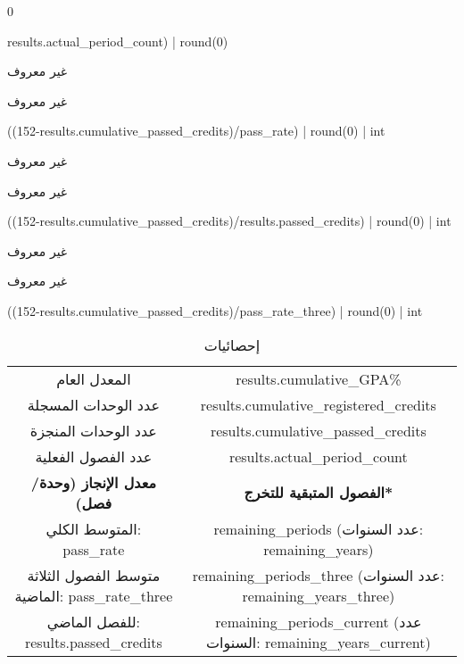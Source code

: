 \documentclass[fontsize=14,headinclude=true, headsepline=true,
footsepline=true]{scrartcl}
\begin{document}
{%
{%
  0
{%
{%
{%
 results.actual_period_count) | round(0) %
{%

{%
{%
غير معروف
{%
{%
غير معروف
{%
{%
{%
 ((152-results.cumulative_passed_credits)/pass_rate) | round(0) | int %
{%
{%


{%
{%
غير معروف
{%
{%
غير معروف
{%
{%
{%
 ((152-results.cumulative_passed_credits)/results.passed_credits) | round(0) | int %
{%
{%

{%
{%
غير معروف
{%
{%
غير معروف
{%
{%
{%
 ((152-results.cumulative_passed_credits)/pass_rate_three) | round(0) | int %
{%
{%


 \begin{table}[!ht]
    \renewcommand*{\arraystretch}{0.8}
   \centering
\small
\caption{إحصائيات}
\begin{tabular}{cccc}
\toprule
\multicolumn{2}{c}{المعدل العام} &  \multicolumn{2}{c}{ {{results.cumulative_GPA}}\% } \\
\multicolumn{2}{c}{عدد الوحدات المسجلة} & \multicolumn{2}{c}{ {{results.cumulative_registered_credits}} }\\
\multicolumn{2}{c}{ عدد الوحدات المنجزة} & \multicolumn{2}{c}{ {{results.cumulative_passed_credits}} }\\
\multicolumn{2}{c}{ عدد الفصول الفعلية} & \multicolumn{2}{c}{ {{results.actual_period_count}} }\\
\midrule
\multicolumn{2}{c}{\textbf{معدل الإنجاز (وحدة/فصل)}} & \multicolumn{2}{c}{\textbf{الفصول المتبقية للتخرج*}} \\
\multicolumn{2}{c}{المتوسط الكلي: {{pass_rate}} } &
\multicolumn{2}{c}{ {{remaining_periods}} (عدد السنوات: {{remaining_years}}) }\\
\multicolumn{2}{c}{متوسط الفصول الثلاثة الماضية: {{pass_rate_three}} } &
\multicolumn{2}{c}{ {{remaining_periods_three}} (عدد السنوات: {{remaining_years_three}}) }\\
\multicolumn{2}{c}{للفصل الماضي: {{results.passed_credits}} } &
\multicolumn{2}{c}{ {{remaining_periods_current}} (عدد السنوات: {{remaining_years_current}}) }\\


\end{tabular}
\end{table}}}}}}}}}}}}}}}}}}}}}}}}}}}}}}}}}}
\end{document}

